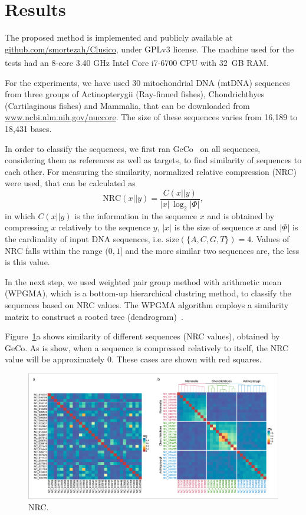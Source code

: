 \documentclass[extendedabs]{recpad2k}
\begin{document}
\section{Results}
The proposed method is implemented and publicly available at \url{github.com/smortezah/Clusico}, under GPLv3 license. The machine used for the tests had an 8-core 3.40 GHz Intel\textsuperscript{\scriptsize\textregistered} Core{\scriptsize\texttrademark} i7-6700 CPU with 32~GB RAM.

For the experiments, we have used 30 mitochondrial DNA (mtDNA) sequences from three groups of Actinopterygii (Ray-finned fishes), Chondrichthyes (Cartilaginous fishes) and Mammalia, that can be downloaded from \url{www.ncbi.nlm.nih.gov/nuccore}. The size of these sequences varies from 16,189 to 18,431 bases.

In order to classify the sequences, we first ran GeCo~\cite{pratas2016efficient} on all sequences, considering them as references as well as targets, to find similarity of sequences to each other. For measuring the similarity, normalized relative compression (NRC) were used, that can be calculated as~\cite{pratas2018comparison}
\begin{equation}
   \mathrm{NRC} (x||y) = \frac{C (x||y)}{|x|\, \log_2 |\Phi|},
\end{equation}
in which $C (x||y)$ is the information in the sequence $x$ and is obtained by compressing $x$ relatively to the sequence $y$, $|x|$ is the size of sequence $x$ and $|\Phi|$ is the cardinality of input DNA sequences, i.e. $ \mathrm{size}(\{A, C, G, T\}) = 4 $. Values of NRC falls within the range $(0, 1]$ and the more similar two sequences are, the less is this value.

In the next step, we used weighted pair group method with arithmetic mean (WPGMA), which is a bottom-up hierarchical clustring method, to classify the sequences based on NRC values. The WPGMA algorithm employs a similarity matrix to construct a rooted tree (dendrogram)~\cite{sokal58a, clifford2011comparison}.

Figure~\ref{fig.nrc}a shows similarity of different sequences (NRC values), obtained by GeCo. As is show, when a sequence is compressed relatively to itself, the NRC value will be approximately 0. These cases are shown with red squares. 

\begin{figure}
   \includegraphics[width=\textwidth]{fig.pdf}
   \caption{NRC.}
   \label{fig.nrc}
\end{figure}



\end{document}
